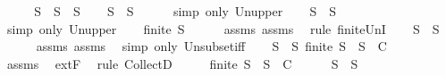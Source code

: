 \begin{isabellebody}
%
\isadelimproof
%
\endisadelimproof
%
\isatagproof
{}\isamarkupfalse%
\ {\isacharminus}\isanewline
\ \ \isamarkupfalse%
\ {\isacharquery}S\ {\isacharequal}\ {\isachardoublequoteopen}S{}\ {\isasymunion}\ S{}{\isachardoublequoteclose}\isanewline
\ \ \isamarkupfalse%
\ {\isachardoublequoteopen}S{}\ {\isasymsubseteq}\ {\isacharquery}S{\isachardoublequoteclose}\isanewline
\ \ \ \ \isamarkupfalse%
\ {\isacharparenleft}simp\ only{\isacharcolon}\ Un{\isacharunderscore}upper{}{\isacharparenright}\isanewline
\ \ \isamarkupfalse%
\ {\isachardoublequoteopen}S{}\ {\isasymsubseteq}\ {\isacharquery}S{\isachardoublequoteclose}\isanewline
\ \ \ \ \isamarkupfalse%
\ {\isacharparenleft}simp\ only{\isacharcolon}\ Un{\isacharunderscore}upper{}{\isacharparenright}\isanewline
\ \ \isamarkupfalse%
\ {\isachardoublequoteopen}finite\ {\isacharquery}S{\isachardoublequoteclose}\isanewline
\ \ \ \ \isamarkupfalse%
\ assms{\isacharparenleft}{}{\isacharparenright}\ assms{\isacharparenleft}{}{\isacharparenright}\ \isamarkupfalse%
\ {\isacharparenleft}rule\ finite{\isacharunderscore}UnI{\isacharparenright}\isanewline
\ \ \isamarkupfalse%
\ {\isachardoublequoteopen}{\isacharquery}S\ {\isasymsubseteq}\ S{\isachardoublequoteclose}\ \isanewline
\ \ \ \ \isamarkupfalse%
\ assms{\isacharparenleft}{}{\isacharparenright}\ assms{\isacharparenleft}{}{\isacharparenright}\ \isamarkupfalse%
\ {\isacharparenleft}simp\ only{\isacharcolon}\ Un{\isacharunderscore}subset{\isacharunderscore}iff{\isacharparenright}\isanewline
\ \ \isamarkupfalse%
\ {\isachardoublequoteopen}{\isasymforall}S{\isacharprime}\ {\isasymsubseteq}\ S{\isachardot}\ finite\ S{\isacharprime}\ {\isasymlongrightarrow}\ S{\isacharprime}\ {\isasymin}\ C{\isachardoublequoteclose}\isanewline
\ \ \ \ \isamarkupfalse%
\ assms{\isacharparenleft}{}{\isacharparenright}\ \isamarkupfalse%
\ extF\ \isamarkupfalse%
\ {\isacharparenleft}rule\ CollectD{\isacharparenright}\isanewline
\ \ \isamarkupfalse%
\ \isamarkupfalse%
\ {\isachardoublequoteopen}finite\ {\isacharquery}S\ {\isasymlongrightarrow}\ {\isacharquery}S\ {\isasymin}\ C{\isachardoublequoteclose}\isanewline
\ \ \ \ \isamarkupfalse%
\ {\isacartoucheopen}{\isacharquery}S\ {\isasymsubseteq}\ S{\isacartoucheclose}\ \isamarkupfalse%

\end{isabellebody}
